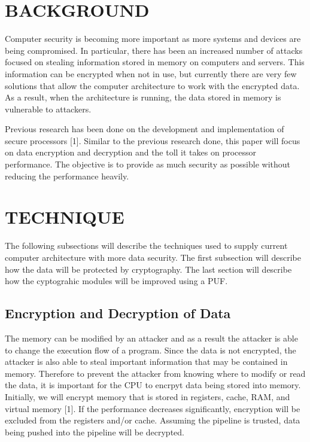 \documentclass[letterpaper, 10pt, conference]{ieeeconf}  %
\begin{document}
\section{BACKGROUND}

Computer security is becoming more important as more systems and devices are being compromised.  In particular, there has been an increased number of attacks focused on stealing information stored in memory on computers and servers.  This information can be encrypted when not in use, but currently there are very few solutions that allow the computer architecture to work with the encrypted data.  As a result, when the architecture is running, the data stored in memory is vulnerable to attackers.

Previous research has been done on the development and implementation of secure processors [1].  Similar to the previous research done, this paper will focus on data encryption and decryption and the toll it takes on processor performance.  The objective is to provide as much security as possible without reducing the performance heavily.

\section{TECHNIQUE}

The following subsections will describe the techniques used to supply current computer architecture with more data security. The first subsection will describe how the data will be protected by cryptography. The last section will describe how the cyptograhic modules will be improved using a PUF.

\subsection{Encryption and Decryption of Data}

The memory can be modified by an attacker and as a result the attacker is able to change the execution flow of a program.  Since the data is not encrypted, the attacker is also able to steal important information that may be contained in memory. Therefore to prevent the attacker from knowing where to modify or read the data, it is important for the CPU to encrpyt data being stored into memory. Initially, we will encrypt memory that is stored in registers, cache, RAM, and virtual memory [1]. If the performance decreases significantly, encryption will be excluded from the registers and/or cache. Assuming the pipeline is trusted, data being pushed into the pipeline will be decrypted.
\end{document}
